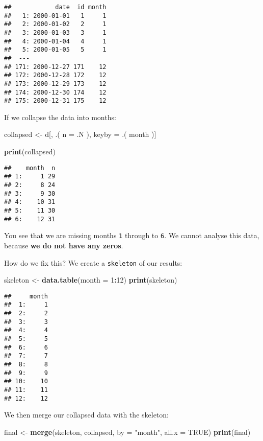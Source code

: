 \documentclass[]{book}
\newenvironment{Shaded}{\begin{snugshade}}{\end{snugshade}}
\newcommand{\KeywordTok}[1]{\textcolor[rgb]{0.13,0.29,0.53}{\textbf{#1}}}
\newcommand{\DataTypeTok}[1]{\textcolor[rgb]{0.13,0.29,0.53}{#1}}
\newcommand{\DecValTok}[1]{\textcolor[rgb]{0.00,0.00,0.81}{#1}}
\newcommand{\StringTok}[1]{\textcolor[rgb]{0.31,0.60,0.02}{#1}}
\newcommand{\OtherTok}[1]{\textcolor[rgb]{0.56,0.35,0.01}{#1}}
\newcommand{\OperatorTok}[1]{\textcolor[rgb]{0.81,0.36,0.00}{\textbf{#1}}}
\newcommand{\NormalTok}[1]{#1}
\begin{document}
\begin{verbatim}
##            date  id month
##   1: 2000-01-01   1     1
##   2: 2000-01-02   2     1
##   3: 2000-01-03   3     1
##   4: 2000-01-04   4     1
##   5: 2000-01-05   5     1
##  ---                     
## 171: 2000-12-27 171    12
## 172: 2000-12-28 172    12
## 173: 2000-12-29 173    12
## 174: 2000-12-30 174    12
## 175: 2000-12-31 175    12
\end{verbatim}

If we collapse the data into months:

\begin{Shaded}
\begin{Highlighting}[]
\NormalTok{collapsed <-}\StringTok{ }\NormalTok{d[, .(}
  \DataTypeTok{n =}\NormalTok{ .N}
\NormalTok{), keyby =}\StringTok{ }\NormalTok{.(}
\NormalTok{  month}
\NormalTok{)]}

\KeywordTok{print}\NormalTok{(collapsed)}
\end{Highlighting}
\end{Shaded}

\begin{verbatim}
##    month  n
## 1:     1 29
## 2:     8 24
## 3:     9 30
## 4:    10 31
## 5:    11 30
## 6:    12 31
\end{verbatim}

You see that we are missing months \texttt{1} through to \texttt{6}. We
cannot analyse this data, because \textbf{we do not have any zeros}.

How do we fix this? We create a \texttt{skeleton} of our results:

\begin{Shaded}
\begin{Highlighting}[]
\NormalTok{skeleton <-}\StringTok{ }\KeywordTok{data.table}\NormalTok{(}\DataTypeTok{month =} \DecValTok{1}\OperatorTok{:}\DecValTok{12}\NormalTok{)}
\KeywordTok{print}\NormalTok{(skeleton)}
\end{Highlighting}
\end{Shaded}

\begin{verbatim}
##     month
##  1:     1
##  2:     2
##  3:     3
##  4:     4
##  5:     5
##  6:     6
##  7:     7
##  8:     8
##  9:     9
## 10:    10
## 11:    11
## 12:    12
\end{verbatim}

We then merge our collapsed data with the skeleton:

\begin{Shaded}
\begin{Highlighting}[]
\NormalTok{final <-}\StringTok{ }\KeywordTok{merge}\NormalTok{(skeleton, collapsed, }\DataTypeTok{by =} \StringTok{"month"}\NormalTok{, }\DataTypeTok{all.x =} \OtherTok{TRUE}\NormalTok{)}
\KeywordTok{print}\NormalTok{(final)}
\end{Highlighting}
\end{Shaded}
\end{document}
